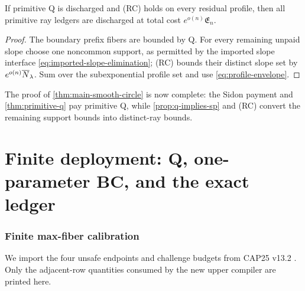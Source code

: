 \documentclass[11pt,a4paper]{amsart}
\numberwithin{equation}{section}
\theoremstyle{remark}
\begin{document}
\begin{proposition}\label{prop:q-implies-sp}
If primitive Q is discharged and \textup{(RC)} holds on every residual
profile, then all primitive ray ledgers are discharged
at total cost \(e^{o(n)}\mathfrak E_n\).
\end{proposition}

\begin{proof}
The boundary prefix fibers are bounded by Q.  For every remaining unpaid
slope choose one noncommon support, as permitted by
the imported slope interface \eqref{eq:imported-slope-elimination}; \textup{(RC)} bounds their distinct slope set by
\(e^{o(n)}\overline N_\lambda\).  Sum over the subexponential profile set and use
\eqref{eq:profile-envelope}.
\end{proof}

The proof of \cref{thm:main-smooth-circle} is now complete: the Sidon payment and \cref{thm:primitive-q} pay primitive Q, while \cref{prop:q-implies-sp} and \textup{(RC)} convert the remaining support bounds into distinct-ray bounds.


\part{Finite deployment: Q, one-parameter BC, and the exact ledger}
\section{Finite max-fiber calibration}\label{sec:finite-calibration}
We import the four unsafe endpoints and challenge budgets from CAP25 v13.2 \cite[Cor.~14.3 and Def.~21.1]{CAP25v132}.  Only the adjacent-row quantities consumed by the new upper compiler are printed here.
\end{document}
